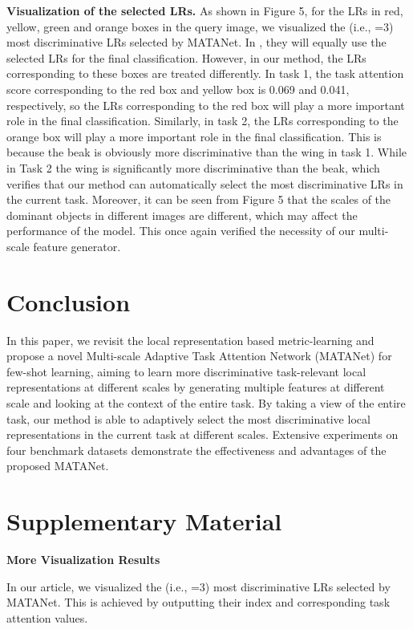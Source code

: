 \documentclass[final]{cvpr}
\begin{document}
	\textbf{Visualization of the selected LRs.} As shown in Figure 5, for the LRs in red, yellow, green and orange boxes in the query image, we visualized the  (i.e., =3) most discriminative LRs selected by MATANet. In \cite{li2019revisiting}, they will equally use the selected LRs for the final classification. 
	However, in our method, the LRs corresponding to these boxes are treated differently. In task 1, the task attention score corresponding to the red box and yellow box is 0.069 and 0.041, respectively, so the LRs corresponding to the red box will play a more important role in the final classification. Similarly,  in task 2, the LRs corresponding to the orange box will play a more important role in the final classification. This is because the beak is obviously more discriminative than the wing in task 1. While in Task 2 the wing is significantly more discriminative than the beak, which verifies that our method can automatically select the most discriminative LRs in the current task. Moreover, it can be seen from Figure 5 that the scales of the dominant objects in different images are different, which may affect the performance of the model. This once again verified the necessity of our multi-scale feature generator.
		
	\section{Conclusion}
	In this paper, we revisit the local representation based metric-learning and propose a novel Multi-scale Adaptive Task Attention Network (MATANet) for few-shot learning, aiming to learn more discriminative task-relevant local representations at different scales by generating multiple features at different scale and looking at the context of the entire task. 
	By taking a view of the entire task, our method is able to adaptively select the most discriminative local representations in the current task at different scales. 
	Extensive experiments on four benchmark datasets demonstrate the effectiveness and advantages of the proposed MATANet. 

	{\small
		
		
	}
	\clearpage
\section*{Supplementary Material }

\noindent
\textbf{More Visualization Results}

In our article, we visualized the  (i.e., =3) most discriminative LRs selected by MATANet. This is achieved by outputting their index and corresponding task attention values. 
\end{document}
